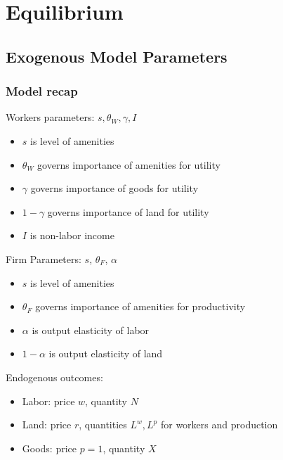 \documentclass[10pt,notes=hide]{beamer}
\begin{document}
\section{Equilibrium}
\subsection{Exogenous Model Parameters}
\begin{frame}
\frametitle{Model recap}
Workers parameters: $s,\theta_W, \gamma, I$
\begin{itemize}
\item $s$ is level of amenities
\item $\theta_W$ governs importance of amenities for utility
\item $\gamma$ governs importance of goods  for utility
\item $1-\gamma$ governs importance of land for utility
\item $I$ is non-labor income \medskip
\end{itemize}
Firm Parameters: $s$, ${\theta_F}$, $\alpha$ 
\begin{itemize}
\item $s$ is level of amenities
\item $\theta_F$ governs importance of amenities for productivity
\item $\alpha$ is output elasticity of labor
\item $1-\alpha$ is output elasticity of land
\end{itemize}
Endogenous outcomes:
\begin{itemize}
\item Labor: price $w$, quantity $N$
\item Land: price $r$, quantities $L^w, L^p$ for workers and production
\item Goods: price $p=1$, quantity $X$  \medskip
\end{itemize}
\end{frame}
\end{document}

